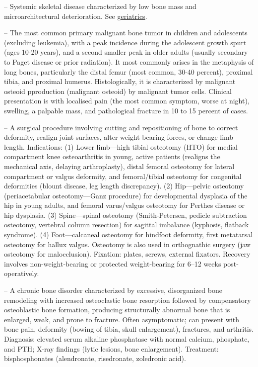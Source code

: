 -- Systemic skeletal disease characterized by low bone mass and microarchitectural deterioration. See \hyperlink{Geriatrics}{geriatrics}.

-- The most common primary malignant bone tumor in children and adolescents (excluding leukemia), with a peak incidence during the adolescent growth spurt (ages 10-20 years), and a second smaller peak in older adults (usually secondary to Paget disease or prior radiation). It most commonly arises in the metaphysis of long bones, particularly the distal femur (most common, 30-40 percent), proximal tibia, and proximal humerus. Histologically, it is characterized by malignant osteoid pproduction (malignant osteoid) by malignant tumor cells. Clinical presentation is with localised pain (the most common symptom, worse at night), swelling, a palpable mass, and pathological fracture in 10 to 15 percent of cases.

-- A surgical procedure involving cutting and repositioning of bone to correct deformity, realign joint surfaces, alter weight-bearing forces, or change limb length. Indications: (1) Lower limb—high tibial osteotomy (HTO) for medial compartment knee osteoarthritis in young, active patients (realigns the mechanical axis, delaying arthroplasty), distal femoral osteotomy for lateral compartment or valgus deformity, and femoral/tibial osteotomy for congenital deformities (blount disease, leg length discrepancy). (2) Hip—pelvic osteotomy (periacetabular osteotomy—Ganz procedure) for developmental dysplasia of the hip in young adults, and femoral varus/valgus osteotomy for Perthes disease or hip dysplasia. (3) Spine—spinal osteotomy (Smith-Petersen, pedicle subtraction osteotomy, vertebral column resection) for sagittal imbalance (kyphosis, flatback syndrome). (4) Foot—calcaneal osteotomy for hindfoot deformity, first metatarsal osteotomy for hallux valgus. Osteotomy is also used in orthognathic surgery (jaw osteotomy for malocclusion). Fixation: plates, screws, external fixators. Recovery involves non-weight-bearing or protected weight-bearing for 6--12 weeks post-operatively.

-- A chronic bone disorder characterized by excessive, disorganized bone remodeling with increased osteoclastic bone resorption followed by compensatory osteoblastic bone formation, producing structurally abnormal bone that is enlarged, weak, and prone to fracture. Often asymptomatic; can present with bone pain, deformity (bowing of tibia, skull enlargement), fractures, and arthritis. Diagnosis: elevated serum alkaline phosphatase with normal calcium, phosphate, and PTH; X-ray findings (lytic lesions, bone enlargement). Treatment: bisphosphonates (alendronate, risedronate, zoledronic acid).

